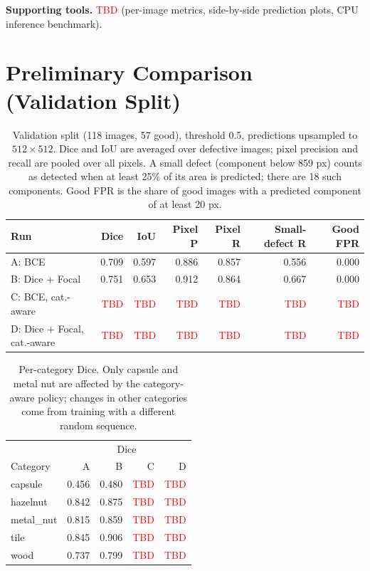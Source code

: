 \documentclass[11pt,a4paper]{article}
\newcommand{\tbd}{\textcolor{red}{TBD}}
\begin{document}
\textbf{Supporting tools.} \tbd{} (per-image metrics, side-by-side prediction plots, CPU inference benchmark).

\section{Preliminary Comparison (Validation Split)}

\begin{table}[H]
\centering
\small
\begin{tabular}{lrrrrrr}
\toprule
Run & Dice & IoU & Pixel P & Pixel R & Small-defect R & Good FPR \\
\midrule
A: BCE & 0.709 & 0.597 & 0.886 & 0.857 & 0.556 & 0.000 \\
B: Dice + Focal & 0.751 & 0.653 & 0.912 & 0.864 & 0.667 & 0.000 \\
C: BCE, cat.-aware & \tbd & \tbd & \tbd & \tbd & \tbd & \tbd \\
D: Dice + Focal, cat.-aware & \tbd & \tbd & \tbd & \tbd & \tbd & \tbd \\
\bottomrule
\end{tabular}
\caption{Validation split (118 images, 57 good), threshold 0.5, predictions upsampled to $512\times512$. Dice and IoU are averaged over defective images; pixel precision and recall are pooled over all pixels. A small defect (component below 859 px) counts as detected when at least 25\% of its area is predicted; there are 18 such components. Good FPR is the share of good images with a predicted component of at least 20 px.}
\label{tab:compare}
\end{table}

\begin{table}[H]
\centering
\small
\begin{tabular}{lrrrr}
\toprule
 & \multicolumn{4}{c}{Dice} \\
Category & A & B & C & D \\
\midrule
capsule & 0.456 & 0.480 & \tbd & \tbd \\
hazelnut & 0.842 & 0.875 & \tbd & \tbd \\
metal\_nut & 0.815 & 0.859 & \tbd & \tbd \\
tile & 0.845 & 0.906 & \tbd & \tbd \\
wood & 0.737 & 0.799 & \tbd & \tbd \\
\bottomrule
\end{tabular}
\caption{Per-category Dice. Only capsule and metal nut are affected by the category-aware policy; changes in other categories come from training with a different random sequence.}
\label{tab:category}
\end{table}
\end{document}
